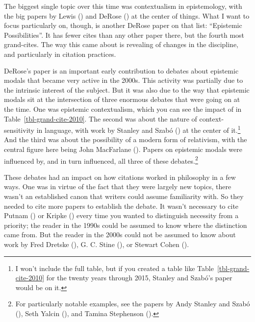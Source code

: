 \documentclass[
  12pt,
  letterpaper,
  DIV=11,
  numbers=noendperiod]{scrartcl}
\begin{document}
The biggest single topic over this time was contextualism in
epistemology, with the big papers by Lewis
() and DeRose
() at the center of things. What
I want to focus particularly on, though, is another DeRose paper on that
list: ``Epistemic Possibilities''. It has fewer cites than any other
paper there, but the fourth most grand-cites. The way this came about is
revealing of changes in the discipline, and particularly in citation
practices.

DeRose's paper is an important early contribution to debates about
epistemic modals that became very active in the 2000s. This activity was
partially due to the intrinsic interest of the subject. But it was also
due to the way that epistemic modals sit at the intersection of three
enormous debates that were going on at the time. One was epistemic
contextualism, which you can see the impact of in
Table~\ref{tbl-grand-cite-2010}. The second was about the nature of
context-sensitivity in language, with work by Stanley and Szabó
() at the center of
it.\footnote{I won't include the full table, but if you created a table
  like Table~\ref{tbl-grand-cite-2010} for the twenty years through
  2015, Stanley and Szabó's paper would be on it.} And the third was
about the possibility of a modern form of relativism, with the central
figure here being John MacFarlane ().
Papers on epistemic modals were influenced by, and in turn influenced,
all three of these debates.\footnote{For particularly notable examples,
  see the papers by Andy Stanley and Szabó
  (), Seth Yalcin
  (), and Tamina Stephenson
  ().}

These debates had an impact on how citations worked in philosophy in a
few ways. One was in virtue of the fact that they were largely new
topics, there wasn't an established canon that writers could assume
familiarity with. So they needed to cite more papers to establish the
debate. It wasn't necessary to cite Putnam
() or Kripke
() every time you wanted to
distinguish necessity from a priority; the reader in the 1990s could be
assumed to know where the distinction came from. But the reader in the
2000s could not be assumed to know about work by Fred Dretske
(), G. C. Stine
(), or Stewart Cohen
().
\end{document}
